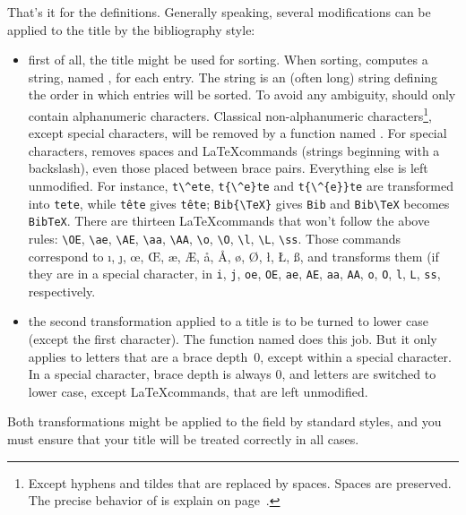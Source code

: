 That's it for the definitions.
Generally speaking, several modifications can be applied to the
title by the bibliography style:
\begin{itemize}
\item first of all, the title might be used for sorting. When sorting,
  \bt computes a string, named , for each
  entry. The  string is an (often long) 
  string defining the order in which
  entries will be sorted. To avoid any ambiguity,  should
  only contain alphanumeric characters. Classical non-alphanumeric 
  characters\footnote{Except hyphens and tildes 
  that are replaced
  by spaces. Spaces are preserved. The precise behavior of 
   is explain on page~\pageref{purify}.}, 
  except special characters, will be removed by 
  a \bt function named . For special characters, 
  removes spaces and 
  \LaTeX commands (strings beginning with a backslash), even those
  placed between brace pairs. Everything else is left unmodified. For
  instance, 
  \verb+t\^ete+, \verb+t{\^e}te+ and \verb+t{\^{e}}te+
are transformed into \verb+tete+, 
while \texttt{t\^ete} gives \texttt{t\^ete};
\verb+Bib{\TeX}+ gives \verb+Bib+ and
\verb+Bib\TeX+ becomes \verb+BibTeX+.
There are thirteen \LaTeX commands that won't follow the above rules:
\verb+\OE+, \verb+\ae+, \verb+\AE+, \verb+\aa+, \verb+\AA+, 
\verb+\o+, \verb+\O+, \verb+\l+, \verb+\L+, \verb+\ss+.
Those commands correspond to \i, \j, \oe,
\OE, \ae, \AE, \aa, \AA, \o, \O,
\l, \L, \ss, and  transforms them (if they are in a special
character, 
in \verb+i+, \verb+j+,
  \verb+oe+, 
\verb+OE+, \verb+ae+, \verb+AE+, \verb+aa+, \verb+AA+, \verb+o+,
  \verb+O+, 
\verb+l+, \verb+L+, \verb+ss+, respectively. 


\item the second transformation applied to a title is to be turned to
  lower case (except the first character). 
  The function named
   does this job. But it only applies to letters that
  are a brace depth~$0$, except within a special character. In a
  special character, brace depth is always $0$, and letters are
  switched to lower case, except \LaTeX commands, that
  are left unmodified.
\end{itemize}
Both transformations might be applied to the  field by 
standard styles, and you must ensure that your title will be treated correctly
in all cases. 

